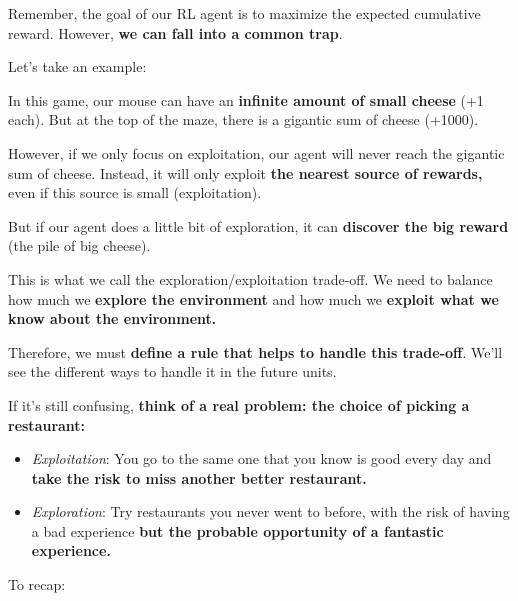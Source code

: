 \documentclass[11pt,a4paper]{article}
\begin{document}
Remember, the goal of our RL agent is to maximize the expected cumulative reward. However, \textbf{we can fall into a common trap}.

Let's take an example:


In this game, our mouse can have an \textbf{infinite amount of small cheese} (+1 each). But at the top of the maze, there is a gigantic sum of cheese (+1000).

However, if we only focus on exploitation, our agent will never reach the gigantic sum of cheese. Instead, it will only exploit \textbf{the nearest source of rewards,} even if this source is small (exploitation).

But if our agent does a little bit of exploration, it can \textbf{discover the big reward} (the pile of big cheese).

This is what we call the exploration/exploitation trade-off. We need to balance how much we \textbf{explore the environment} and how much we \textbf{exploit what we know about the environment.}

Therefore, we must \textbf{define a rule that helps to handle this trade-off}. We'll see the different ways to handle it in the future units.

If it's still confusing, \textbf{think of a real problem: the choice of picking a restaurant:}



\begin{itemize}
\tightlist
\item
  \emph{Exploitation}: You go to the same one that you know is good every day and \textbf{take the risk to miss another better restaurant.}
\item
  \emph{Exploration}: Try restaurants you never went to before, with the risk of having a bad experience \textbf{but the probable opportunity of a fantastic experience.}
\end{itemize}

To recap:

\end{document}
